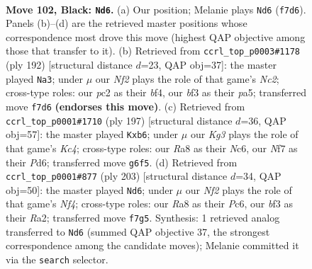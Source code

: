 \documentclass[11pt]{article}
\begin{document}
\clearpage

\begin{figure}[p]\centering
\begin{subfigure}{0.46\textwidth}\centering
\resizebox{\linewidth}{!}{%
\newchessgame
\chessboard[
  setfen={r7/PR3n2/6k1/6P1/8/5BKP/2P5/8 b - - 4 102},
  showmover=false,
  pgfstyle=straightmove, color=movearrow, markmove={f7-d6}
]}
\caption{}
\end{subfigure}\hfill
\begin{subfigure}{0.46\textwidth}\centering
\resizebox{\linewidth}{!}{%
\newchessgame
\chessboard[
  setfen={8/1p2R3/8/p2k4/P2p1b2/8/2N2r2/3K4 w - - 10 97},
  showmover=false,
  pgfstyle=straightmove, color=movearrow, markmove={c2-a3}
]}
\caption{}
\end{subfigure}
\\[4pt]
\begin{subfigure}{0.46\textwidth}\centering
\resizebox{\linewidth}{!}{%
\newchessgame
\chessboard[
  setfen={r7/P2R4/1Pnp4/2k5/8/8/1K6/8 b - - 4 99},
  showmover=false,
  pgfstyle=straightmove, color=movearrow, markmove={c5-b6}
]}
\caption{}
\end{subfigure}\hfill
\begin{subfigure}{0.46\textwidth}\centering
\resizebox{\linewidth}{!}{%
\newchessgame
\chessboard[
  setfen={8/PR6/2p5/1P1k1n2/3P4/2K5/r7/8 b - - 0 102},
  showmover=false,
  pgfstyle=straightmove, color=movearrow, markmove={f5-d6}
]}
\caption{}
\end{subfigure}
\caption{\textbf{Move 102, Black: \texttt{Nd6}.} (a) Our position; Melanie plays \texttt{Nd6} (\texttt{f7d6}). Panels (b)--(d) are the retrieved master positions whose correspondence most drove this move (highest QAP objective among those that transfer to it). (b) Retrieved from \texttt{ccrl\_top\_p0003\#1178} (ply 192) [structural distance $d$=23, QAP obj=37]: the master played \texttt{Na3}; under $\mu$ our \emph{Nf2} plays the role of that game's \emph{Nc2}; cross-type roles: our \emph{p}c2 as their \emph{b}f4, our \emph{b}f3 as their \emph{p}a5; transferred move \texttt{f7d6} \textbf{(endorses this move)}. (c) Retrieved from \texttt{ccrl\_top\_p0001\#1710} (ply 197) [structural distance $d$=36, QAP obj=57]: the master played \texttt{Kxb6}; under $\mu$ our \emph{Kg3} plays the role of that game's \emph{Kc4}; cross-type roles: our \emph{R}a8 as their \emph{N}c6, our \emph{N}f7 as their \emph{P}d6; transferred move \texttt{g6f5}. (d) Retrieved from \texttt{ccrl\_top\_p0001\#877} (ply 203) [structural distance $d$=34, QAP obj=50]: the master played \texttt{Nd6}; under $\mu$ our \emph{Nf2} plays the role of that game's \emph{Nf4}; cross-type roles: our \emph{R}a8 as their \emph{P}c6, our \emph{b}f3 as their \emph{R}a2; transferred move \texttt{f7g5}. Synthesis: 1 retrieved analog transferred to \texttt{Nd6} (summed QAP objective 37, the strongest correspondence among the candidate moves); Melanie committed it via the \texttt{search} selector.}
\label{fig:thought-m203}
\end{figure}
\end{document}
